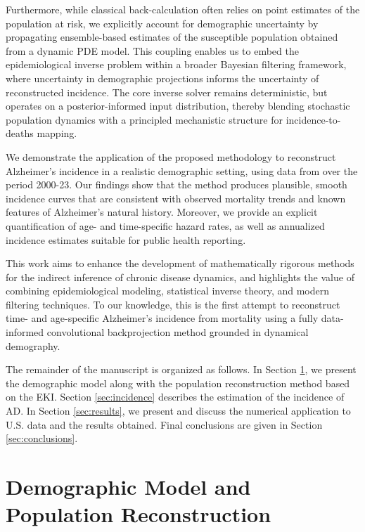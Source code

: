 \documentclass{article}
\begin{document}
Furthermore, while classical back-calculation often relies on point estimates of the population at risk, we explicitly account for demographic uncertainty by propagating ensemble-based estimates of the susceptible population obtained from a dynamic PDE model. This coupling enables us to embed the epidemiological inverse problem within a broader Bayesian filtering framework, where uncertainty in demographic projections informs the uncertainty of reconstructed incidence. The core inverse solver remains deterministic, but operates on a posterior-informed input distribution, thereby blending stochastic population dynamics with a principled mechanistic structure for incidence-to-deaths mapping.

We demonstrate the application of the proposed methodology to reconstruct Alzheimer’s incidence in a realistic demographic setting, using data from \cite{cdc_wonder} over the period 2000-23. Our findings show that the method produces plausible, smooth incidence curves that are consistent with observed mortality trends and known features of Alzheimer’s natural history. Moreover, we provide an explicit quantification of age- and time-specific hazard rates, as well as annualized incidence estimates suitable for public health reporting.

This work aims to enhance the development of mathematically rigorous methods for the indirect inference of chronic disease dynamics, and highlights the value of combining epidemiological modeling, statistical inverse theory, and modern filtering techniques. To our knowledge, this is the first attempt to reconstruct time- and age-specific Alzheimer’s incidence from mortality using a fully data-informed convolutional backprojection method grounded in dynamical demography.

The remainder of the manuscript is organized as follows. In Section \ref{sec:model}, we present the demographic model along with the population reconstruction method based on the EKI. Section \ref{sec:incidence} describes the estimation of the incidence of AD. In Section \ref{sec:results}, we present and discuss the numerical application to U.S. data and the results obtained. Final conclusions are given in Section \ref{sec:conclusions}.

\section{Demographic Model and Population Reconstruction}\label{sec:model}
\end{document}
